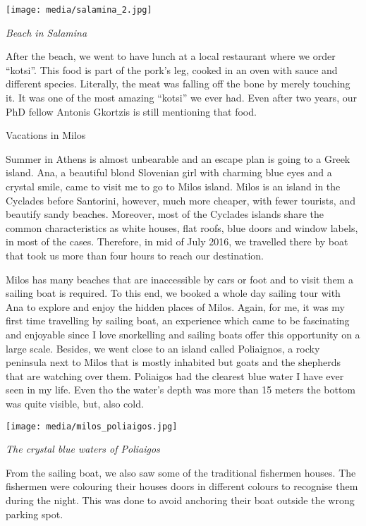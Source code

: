 \documentclass[10pt,a4paper]{article} %
\newcommand{\NewsItem}[1]{ %
\usefont{T1}{fvs}{n}{n} %
\vspace{24pt}\large #1\vspace{3pt} %
\par \normalsize \normalfont}
\begin{document}
\begin{multicols}{3}
\begin{center}
	\texttt{[image: media/salamina\_2.jpg]}
	\par\textit{Beach in Salamina}
\end{center}

After the beach, we went to have lunch at a local restaurant where we order ``kotsi''. 
This food is part of the pork's leg, cooked in an oven with sauce and different 
species. 
Literally, the meat was falling off the bone by merely touching it. 
It was one of the most amazing ``kotsi'' we ever had. 
Even after two years, our PhD fellow Antonis Gkortzis is still mentioning that food.     

\NewsItem{Vacations in Milos}
Summer in Athens is almost unbearable and an escape plan is going to a Greek island. 
Ana, a beautiful blond Slovenian girl with charming blue eyes 
and a crystal smile, came to visit me to go to Milos island. 
Milos is an island in the Cyclades before Santorini, however, much more 
cheaper, with fewer tourists, and beautify sandy beaches. 
Moreover, most of the Cyclades islands share the common characteristics as 
white houses, flat roofs, blue doors and window labels, in most of the cases. 
Therefore, in mid of July 2016, we travelled there by boat that took us more than four hours to reach 
our destination. 

Milos has many beaches that are inaccessible by cars or foot and to visit them 
a sailing boat is required. 
To this end, we booked a whole day sailing tour with Ana to explore and enjoy 
the hidden places of Milos. 
Again, for me, it was my first time travelling by sailing boat, an  experience 
which came to be fascinating and enjoyable since I love snorkelling and sailing 
boats offer this opportunity on a large scale. 
Besides, we went close to an island called Poliaignos,
a rocky peninsula next to Milos that is mostly inhabited
but goats and the shepherds that are watching over them.
Poliaigos had the clearest blue water I have ever seen in my life. 
Even tho the water's depth was more than 15 meters the bottom was quite 
visible, but, also cold.

\begin{center}
	\texttt{[image: media/milos\_poliaigos.jpg]}
	\par\textit{The crystal blue waters of Poliaigos}
\end{center}

From the sailing boat, we also saw some of the traditional fishermen houses.  
The fishermen were colouring their houses doors in different colours 
to recognise them during the night. 
This was done to avoid anchoring their boat outside the wrong parking spot.


\end{multicols}
\end{document}
